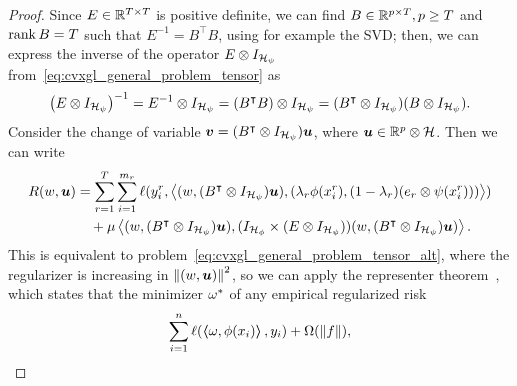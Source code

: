 \begin{proof}
    Since ${E} \in \mathbb{R}^{T \times T}$ is positive definite, we can find $B \in \mathbb{R}^{p \times T}, p \geq T$ and $\operatorname{rank}{B} = T$ such that $E^{-1} =
            {B^\intercal} {B}$, using for example the SVD;
    then, we can express the inverse of the operator $E \otimes I_{\mathcal{H}_\psi}$ from~\eqref{eq:cvxgl_general_problem_tensor} as
    $$ \left(E \otimes I_{\mathcal{H}_\psi}\right)^{-1} = E^{-1} \otimes I_{\mathcal{H}_\psi} = (B^\intercal B) \otimes I_{\mathcal{H}_\psi} = (B^\intercal \otimes I_{\mathcal{H}_\psi}) (B \otimes I_{\mathcal{H}_\psi}).$$
    Consider the change of variable $\bm{v} = (B^\intercal \otimes I_{\mathcal{H}_\psi}) \bm{u}$, where $\bm{u} \in \mathbb{R}^p \otimes \mathcal{H}$. Then we can write
    \begin{equation}
        \nonumber
        \begin{aligned}
            R(w, \bm{u}) & = \sum_{r=1}^{T} \sum_{i=1}^{m_r} \ell(y_i^r, \bm{\left\langle} (w, (B^\intercal \otimes I_{\mathcal{H}_\psi}) \bm{u}),  (\lambda_r \phi(x_i^r), (1 - \lambda_r) (e_r \otimes \psi(x_i^r))) \bm{\right\rangle}) \\
                         & \quad + \mu \bm{\left\langle} (w, (B^\intercal \otimes I_{\mathcal{H}_\psi}) \bm{u}), (I_{\mathcal{H}_\phi} \times (E \otimes I_{\mathcal{H}_\psi})) (w, (B^\intercal \otimes I_{\mathcal{H}_\psi}) \bm{u})  \bm{\right\rangle}                    .
        \end{aligned}
    \end{equation}
    This is equivalent to problem~\eqref{eq:cvxgl_general_problem_tensor_alt}, where the regularizer is increasing in $\left\lVert(w, \bm{u})\right\rVert^2$, so we can apply the representer theorem~\citep{ScholkopfHS01}, which states that the minimizer ${\omega}^*$ of any empirical regularized risk
    \begin{equation}
        \nonumber
        \sum_{i=1}^\nsamples \ell(\dotp{\omega}{\phi(x_i)}, y_i) + \Omega(\norm{f}),

\end{equation}
\end{proof}
